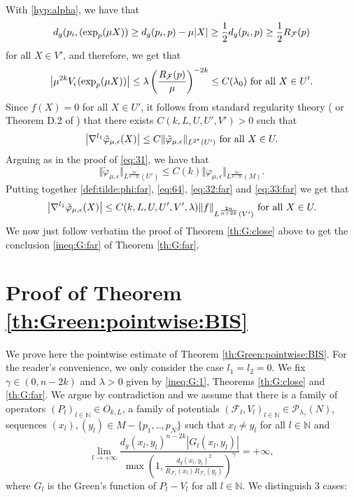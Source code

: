 \documentclass[reqno]{amsart}
\def \nn {\mathbb{N}}
\def \eps {\epsilon}
\def \crit {2^\star}
\def \F {{\mathcal F}}
\begin{document}
With \eqref{hyp:alpha}, we have that
$$d_g(p_i,(\hbox{exp}_{p}(\mu X) )\geq d_g(p_i,p)-\mu|X|\geq \frac{1}{2}d_g(p_i,p)\geq \frac{1}{2}R_{\F}(p)$$
for all $X\in V'$, and therefore, we get that 
\begin{equation*}
\left|\mu^{2k}V_\eps(\hbox{exp}_{p}(\mu X))\right|\leq \lambda\left(\frac{R_{\F}(p)}{\mu}\right)^{-2k} \leq C(\lambda_0)\hbox{ for all }X\in U' .
\end{equation*}
Since $f(X)=0$ for all $X\in U'$, it follows from standard regularity theory (\cite{ADN} or Theorem D.2 of \cite{robert:gjms}) that there exists $C( k,L,  U,U',V')>0$ such that
\begin{equation}\label{eq:64}
  \left|\nabla^{l_1}\tilde{\varphi}_{\mu,\eps}(X)\right|\leq C\Vert \tilde{\varphi}_{\mu,\eps} \Vert_{L^{\crit}(U')}\hbox{ for all }X\in U.
\end{equation}
Arguing as in the proof of \eqref{eq:31}, we have that
\begin{equation}\label{eq:32:far}
\Vert \tilde{\varphi}_{\mu,\eps}\Vert_{L^{\frac{2n}{n-2k}}(U')}\leq C(k)\Vert  \varphi_{\mu,\eps}\Vert_{L^{\frac{2n}{n-2k}}(M)}.
\end{equation}
Putting together \eqref{def:tilde:phi:far}, \eqref{eq:64}, \eqref{eq:32:far} and \eqref{eq:33:far} we get that
\begin{equation*}
  \left| \nabla^{l_1}\tilde{\varphi}_{\mu,\eps}(X) \right|\leq C( k,L, U,U',V',\lambda) \Vert f\Vert_{L^{\frac{2n}{n+2k}}(V')} \hbox{ for all }X\in U.
\end{equation*}
We now just follow verbatim the proof of Theorem \ref{th:G:close} above to get the conclusion \eqref{ineq:G:far}  of Theorem \ref{th:G:far}.  

 
\section{Proof of Theorem \ref{th:Green:pointwise:BIS}}\label{sec:green4}
We prove here the pointwise estimate of Theorem \ref{th:Green:pointwise:BIS}. For the reader's convenience, we only consider the case $l_1=l_2=0$. We fix $\gamma\in (0, n-2k)$ and $\lambda>0$ given by \eqref{ineq:G:1}, Theorems \ref{th:G:close} and \ref{th:G:far}. We argue by contradiction and we assume that there is a family of operators $(P_l)_{l\in\nn}\in O_{k,L}$, a family of potentials $(\F_l,V_l)_{l\in\nn}\in {\mathcal P}_{\lambda_\gamma}(N)$, sequences $(x_l), (y_l)\in M-\{p_1,..,p_N\}$ such that $x_l\neq y_l$ for all $l\in\nn$ and
\begin{equation}\label{hyp:absurd}
\lim_{l\to +\infty}\frac{d_g(x_l,y_l)^{n-2k}|G_l(x_l,y_l)|}{\max\left(1, \frac{d_g(x_l,y_l)^2}{R_{\F_l}(x_l)R_{\F_l}(y_l)} \right)^\gamma }=+\infty,
\end{equation}
where $G_l$ is the Green's function of $P_l-V_l$ for all $l\in\nn$. We distinguish 3 cases:
\end{document}
